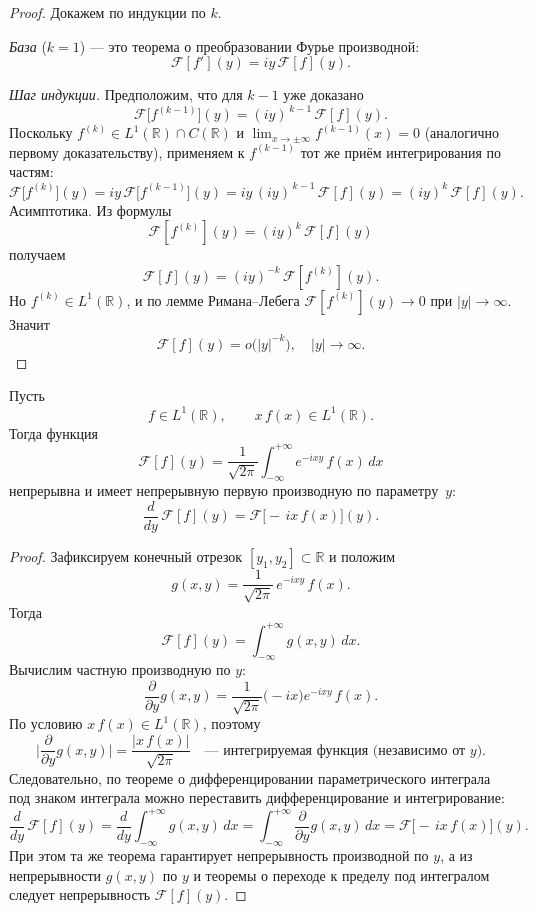 \begin{proof}
    Докажем по индукции по $k$.

    \textit{База} ($k=1$) — это теорема о преобразовании Фурье производной:
    \[
        \mathcal F[f'](y)
        =iy\,\mathcal F[f](y).
    \]

    \textit{Шаг индукции.} Предположим, что для $k-1$ уже доказано
    \[
        \mathcal F\bigl[f^{(k-1)}\bigr](y)
        =(iy)^{\,k-1}\,\mathcal F[f](y).
    \]
    Поскольку $f^{(k)}\in L^1(\mathbb R)\cap C(\mathbb R)$ и $\lim_{x\to\pm\infty}f^{(k-1)}(x)=0$
    (аналогично первому доказательству), применяем к $f^{(k-1)}$ тот же приём интегрирования по частям:
    \[
        \mathcal F\bigl[f^{(k)}\bigr](y)
        =iy\,\mathcal F\bigl[f^{(k-1)}\bigr](y)
        =iy\,(iy)^{\,k-1}\,\mathcal F[f](y)
        =(iy)^k\,\mathcal F[f](y).
    \]
    Асимптотика. Из формулы
    \[
        \mathcal F[f^{(k)}](y)
        =(iy)^k\,\mathcal F[f](y)
    \]
    получаем
    \[
        \mathcal F[f](y)
        =(iy)^{-k}\,\mathcal F[f^{(k)}](y).
    \]
    Но $f^{(k)}\in L^1(\mathbb R)$, и по лемме Римана–Лебега
    $\mathcal F[f^{(k)}](y)\to0$ при $|y|\to\infty$. Значит
    \[
        \mathcal F[f](y)
        =o\bigl(|y|^{-k}\bigr),
        \quad |y|\to\infty.
    \]
\end{proof}


\begin{theorem}
    Пусть
    \[
        f\in L^1(\mathbb R),
        \qquad
        x\,f(x)\in L^1(\mathbb R).
    \]
    Тогда функция
    \[
        \mathcal F[f](y)
        =\frac1{\sqrt{2\pi}}\int_{-\infty}^{+\infty}e^{-i x y}\,f(x)\,dx
    \]
    непрерывна и имеет непрерывную первую производную по параметру~$y$:
    \[
        \frac{d}{dy}\,\mathcal F[f](y)
        =\mathcal F\bigl[-\,i x\,f(x)\bigr](y).
    \]
\end{theorem}

\begin{proof}
    Зафиксируем конечный отрезок $[y_1,y_2]\subset\mathbb R$ и положим
    \[
        g(x,y)
        =\frac1{\sqrt{2\pi}}\,e^{-i x y}\,f(x).
    \]
    Тогда
    \[
        \mathcal F[f](y)=\int_{-\infty}^{+\infty}g(x,y)\,dx.
    \]
    Вычислим частную производную по $y$:
    \[
        \frac{\partial}{\partial y}g(x,y)
        =\frac1{\sqrt{2\pi}}\bigl(-i x\bigr)e^{-i x y}\,f(x).
    \]
    По условию $x\,f(x)\in L^1(\mathbb R)$, поэтому
    \[
        \biggl|\frac{\partial}{\partial y}g(x,y)\biggr|
        =\frac{|x\,f(x)|}{\sqrt{2\pi}}
        \quad\text{— интегрируемая функция (независимо от $y$).}
    \]
    Следовательно, по теореме о дифференцировании параметрического
    интеграла под знаком интеграла можно переставить дифференцирование и
    интегрирование:
    \[
        \frac{d}{dy}\,\mathcal F[f](y)
        =\frac{d}{dy}\int_{-\infty}^{+\infty}g(x,y)\,dx
        =\int_{-\infty}^{+\infty}\frac{\partial}{\partial y}g(x,y)\,dx
        =\mathcal F\bigl[-\,i x\,f(x)\bigr](y).
    \]
    При этом та же теорема гарантирует непрерывность производной по $y$,
    а из непрерывности $g(x,y)$ по $y$ и теоремы о переходе к пределу под интегралом следует непрерывность  $\mathcal F[f](y)$.
\end{proof}

